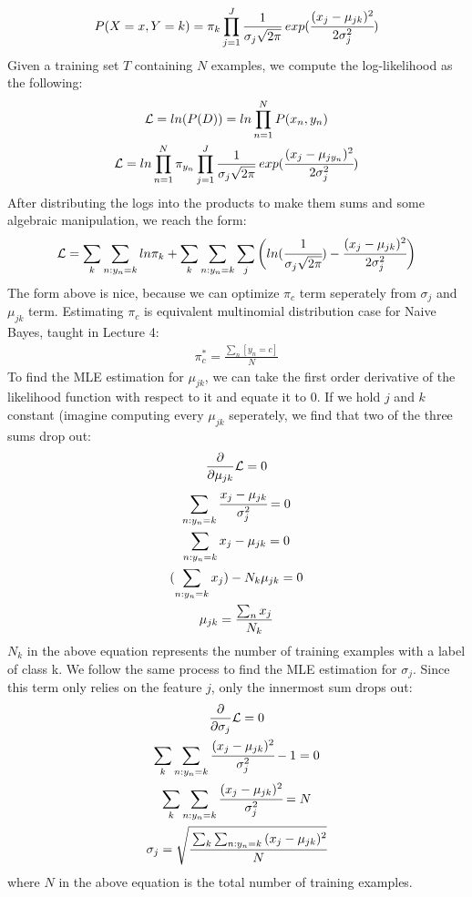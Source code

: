 \documentclass[12pt]{article}
\begin{document}
\begin{enumerate}[label=\alph*.]
\begin{gather*}
	    P(X = x, Y = k) = \pi_k \prod_{j=1}^{J}{\frac{1}{\sigma_j \sqrt{2 \pi}}\, exp(\cfrac{(x_j - \mu_{jk})^2}{2 \sigma_j^2})}
	\end{gather*}
	Given a training set \( T \) containing \( N \) examples, we compute the log-likelihood as the following:
	\begin{gather*}
		\mathcal{L} = ln(P(D)) = ln \prod_{n=1}^{N}{ P(x_n, y_n) } \\
		\mathcal{L} = ln \prod_{n=1}^{N}{ \pi_{y_n} \prod_{j=1}^{J}{\frac{1}{\sigma_j \sqrt{2 \pi}}\, exp(\cfrac{(x_j - \mu_{jy_n})^2}{2 \sigma_j^2})} } \\
	\end{gather*}
	After distributing the logs into the products to make them sums and some algebraic manipulation, we reach the form:
	\begin{gather*}
		\mathcal{L} = \sum_k{\sum_{n:y_n = k}{ln \pi_{k}}} + \sum_k{\sum_{n:y_n = k}{\sum_j{{\bigg( ln(\cfrac{1}{\sigma_j \sqrt{2 \pi}}) - \cfrac{(x_j - \mu_{jk})^2}{2\sigma_j^2} \bigg) }}}}
	\end{gather*}
	The form above is nice, because we can optimize \( \pi_{c} \) term seperately from $\sigma_j$ and $\mu_{jk}$ term. Estimating $\pi_{c}$ is equivalent multinomial distribution case for Naive Bayes, taught in Lecture 4:
	\begin{gather*}
		\pi_c^* = \frac{\sum_n{[y_n = c]}}{N}
	\end{gather*}
	To find the MLE estimation for $\mu_{jk}$, we can take the first order derivative of the likelihood function with respect to it and equate it to 0. If we hold $j$ and $k$ constant (imagine computing every $\mu_{jk}$ seperately, we find that two of the three sums drop out:
	\begin{gather*}
		\frac{\partial}{\partial \mu_{jk}} \mathcal{L} = 0 \\
		\sum_{n:y_n = k}{\cfrac{x_j - \mu_{jk} }{\sigma_j^2}} = 0 \\ 
		\sum_{n:y_n = k}{x_j - \mu_{jk}} = 0 \\ 
		(\sum_{n:y_n = k}{x_j}) - N_k \mu_{jk} = 0 \\ 
		\mu_{jk} = \frac{\sum_n{x_j}}{N_k}
	\end{gather*}
	$N_k$ in the above equation represents the number of training examples with a label of class k. We follow the same process to find the MLE estimation for $\sigma_j$. Since this term only relies on the feature $j$, only the innermost sum drops out:
	\begin{gather*}
		\frac{\partial}{\partial \sigma_j}\mathcal{L} = 0 \\
		\sum_{k}{\sum_{n:y_n = k}{\cfrac{(x_j - \mu_{jk})^2}{\sigma_j^2} - 1}} = 0 \\
		\sum_{k}{\sum_{n:y_n = k}{\cfrac{(x_j - \mu_{jk})^2}{\sigma_j^2}}} = N \\ 
		\sigma_j = \sqrt{\cfrac{\sum_{k}{\sum_{n:y_n = k}{(x_j - \mu_{jk})^2}}}{N}} 
	\end{gather*}
	where $N$ in the above equation is the total number of training examples.
\end{enumerate}
\end{document}
